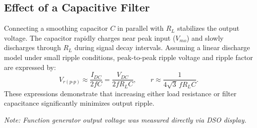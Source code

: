 \subsection{Effect of a Capacitive Filter}
Connecting a smoothing capacitor $C$ in parallel with $R_L$ stabilizes the output voltage. The capacitor rapidly charges near peak input ($V_{mo}$) and slowly discharges through $R_L$ during signal decay intervals. Assuming a linear discharge model under small ripple conditions, peak-to-peak ripple voltage and ripple factor are expressed by:
\[
V_{r(p\text{-}p)} \approx \frac{I_{DC}}{2fC} = \frac{V_{DC}}{2fR_LC}, \qquad r \approx \frac{1}{4\sqrt{3}\,fR_LC}.
\]
These expressions demonstrate that increasing either load resistance or filter capacitance significantly minimizes output ripple.

\begin{table}[h!]
	\centering
	\caption{List of Equipment and Components Used}
	\vspace{2mm}
	\label{tab:apparatus6}
\end{table}
\textit{Note: Function generator output voltage was measured directly via DSO display.}

